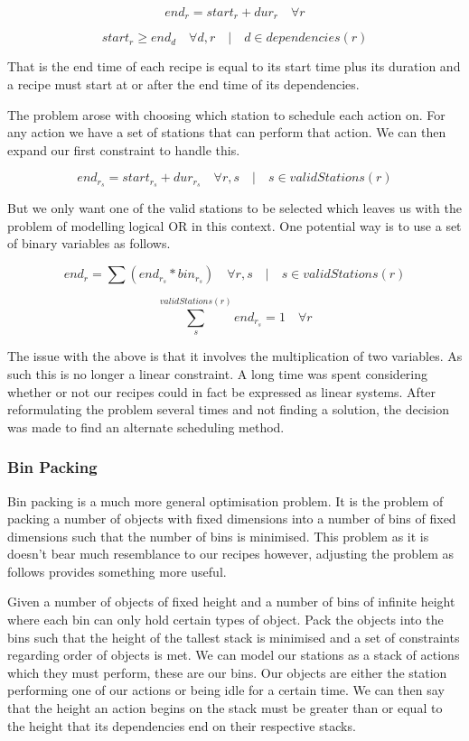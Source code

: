 \documentclass[11pt]{article}
\begin{document}
\[ end_r = start_r + dur_r \quad \forall r \]

\[ start_r \geq end_d \quad \forall d,r \quad | \quad d \in dependencies(r) \]

That is the end time of each recipe is equal to its start time plus its duration and a recipe
must start at or after the end time of its dependencies.

The problem arose with choosing which station to schedule each action on. For any action we
have a set of stations that can perform that action. We can then expand our first constraint
to handle this.

\[ end_{r_s} = start_{r_s} + dur_{r_s} \quad \forall r,s \quad | \quad s \in validStations(r) \]

But we only want one of the valid stations to be selected which leaves us with the problem
of modelling logical OR in this context. One potential way is to use a set of binary variables
as follows.

\[ end_r = \sum (end_{r_s} * bin_{r_s}) \quad \forall r,s \quad | \quad s \in validStations(r) \]

\[ \sum_{s}^{validStations(r)} end_{r_s} = 1 \quad \forall r \]

The issue with the above is that it involves the multiplication of two variables. As such this
is no longer a linear constraint. A long time was spent considering whether or not our recipes
could in fact be expressed as linear systems. After reformulating the problem several times
and not finding a solution, the decision was made to find an alternate scheduling method.

\subsubsection{Bin Packing}

Bin packing is a much more general optimisation problem. It is the problem of packing a number
of objects with fixed dimensions into a number of bins of fixed dimensions such that the number
of bins is minimised. This problem as it is doesn't bear much resemblance to our recipes however,
adjusting the problem as follows provides something more useful.

\medbreak

Given a number of objects of fixed height and a number of bins of infinite height where each
bin can only hold certain types of object. Pack the objects into the bins such that the
height of the tallest stack is minimised and a set of constraints regarding order of
objects is met. We can model our stations as a stack of actions which they must perform,
these are our bins. Our objects are either the station performing one of our actions
or being idle for a certain time. We can then say that the height an action begins on
the stack must be greater than or equal to the height that its dependencies end on their
respective stacks.
\end{document}
